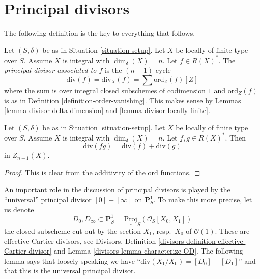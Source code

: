 \section{Principal divisors}
\label{section-principal-divisors}

\noindent
The following definition is the key to everything that follows.

\begin{definition}
\label{definition-principal-divisor}
Let $(S, \delta)$ be as in Situation \ref{situation-setup}.
Let $X$ be locally of finite type over $S$. Assume $X$ is
integral with $\dim_\delta(X) = n$.
Let $f \in R(X)^*$. The {\it principal divisor
associated to $f$} is the $(n - 1)$-cycle
$$
\text{div}(f) = \text{div}_X(f) = \sum \text{ord}_Z(f) [Z]
$$
where the sum is over integral closed subschemes of
codimension $1$ and $\text{ord}_Z(f)$ is as in
Definition \ref{definition-order-vanishing}. This makes sense
by Lemmas \ref{lemma-divisor-delta-dimension} and
\ref{lemma-divisor-locally-finite}.
\end{definition}


\begin{lemma}
\label{lemma-div-additive}
Let $(S, \delta)$ be as in Situation \ref{situation-setup}.
Let $X$ be locally of finite type over $S$. Assume $X$ is
integral with $\dim_\delta(X) = n$.
Let $f, g \in R(X)^*$.
Then
$$
\text{div}(fg) = \text{div}(f) + \text{div}(g)
$$
in $Z_{n - 1}(X)$.
\end{lemma}

\begin{proof}
This is clear from the additivity of the $\text{ord}$ functions.
\end{proof}

\noindent
An important role in the discussion of principal divisors
is played by the ``universal'' principal divisor $[0] - [\infty]$
on $\mathbf{P}^1_S$. To make this more precise, let us denote
$$
D_0, D_\infty \subset
\mathbf{P}^1_S = \underline{\text{Proj}}_S(\mathcal{O}_S[X_0, X_1])
$$
the closed subscheme cut out by the section $X_1$, resp.\ $X_0$
of $\mathcal{O}(1)$. These are effective Cartier divisors, see
Divisors, Definition \ref{divisors-definition-effective-Cartier-divisor}
and Lemma \ref{divisors-lemma-characterize-OD}.
The following lemma says that loosely speaking we have
``$\text{div}(X_1/X_0) = [D_0] - [D_1]$'' and that this is the
universal principal divisor.

